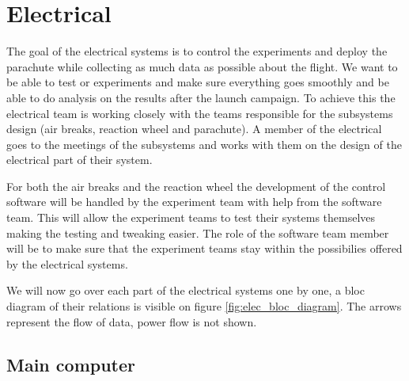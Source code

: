 \section{Electrical}


The goal of the electrical systems is to control the experiments and deploy the parachute while collecting as much data as possible about the flight.
We want to be able to test or experiments and make sure everything goes smoothly and be able to do analysis on the results after the launch campaign.
To achieve this the electrical team is working closely with the teams responsible for the subsystems design (air breaks, reaction wheel and parachute).
A member of the electrical goes to the meetings of the subsystems and works with them on the design of the electrical part of their system.

For both the air breaks and the reaction wheel the development of the control software will be handled by the experiment team with help from the software team.
This will allow the experiment teams to test their systems themselves making the testing and tweaking easier.
The role of the software team member will be to make sure that the experiment teams stay within the possibilies offered by the electrical systems.




We will now go over each part of the electrical systems one by one, a bloc diagram of their relations is visible on figure \ref{fig:elec_bloc_diagram}.
The arrows represent the flow of data, power flow is not shown.

\subsection{Main computer}


